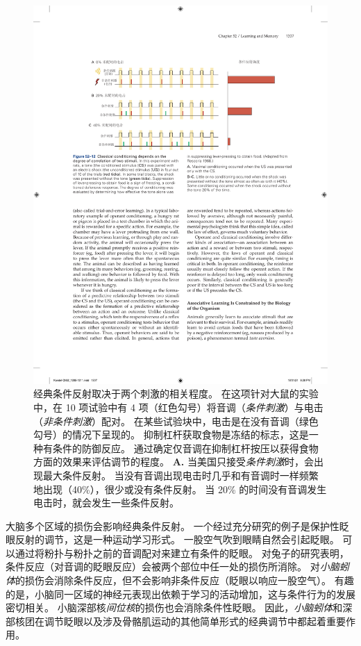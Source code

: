 \begin{figure}[htbp]
	\centering
	\includegraphics[width=0.98\linewidth]{chap52/fig_52_12}
	\caption{经典条件反射取决于两个刺激的相关程度。
		在这项针对大鼠的实验中，在 10 项试验中有 4 项（红色勾号）将音调（\textit{条件刺激}）与电击（\textit{非条件刺激}）配对。
		在某些试验块中，电击是在没有音调（绿色勾号）的情况下呈现的。
		抑制杠杆获取食物是冻结的标志，这是一种有条件的防御反应。
		通过确定仅音调在抑制杠杆按压以获得食物方面的效果来评估调节的程度\cite{rescorla1968probability}。
		\textbf{A.} 当美国只接受\textit{条件刺激}时，会出现最大条件反射。 
		当没有音调出现电击时几乎和有音调时一样频繁地出现（40\%），很少或没有条件反射。
		当 20\% 的时间没有音调发生电击时，就会发生一些条件反射。}
	\label{fig:52_12}
\end{figure}


大脑多个区域的损伤会影响经典条件反射。
一个经过充分研究的例子是保护性眨眼反射的调节，这是一种运动学习形式。
一股空气吹到眼睛自然会引起眨眼。
可以通过将粉扑与粉扑之前的音调配对来建立有条件的眨眼。
对兔子的研究表明，条件反应（对音调的眨眼反应）会被两个部位中任一处的损伤所消除。
对\textit{小脑蚓体}的损伤会消除条件反应，但不会影响非条件反应（眨眼以响应一股空气）。
有趣的是，小脑同一区域的神经元表现出依赖于学习的活动增加，这与条件行为的发展密切相关。
小脑深部核\textit{间位核}的损伤也会消除条件性眨眼。
因此，\textit{小脑蚓体}和深部核团在调节眨眼以及涉及骨骼肌运动的其他简单形式的经典调节中都起着重要作用。


